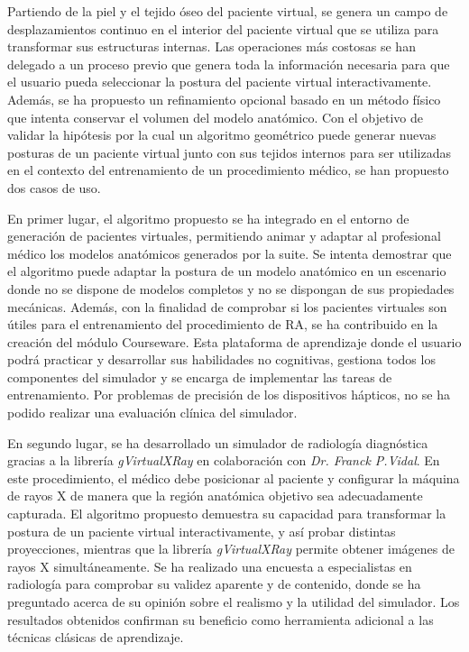 Partiendo de la piel y el tejido óseo del paciente virtual, se genera un campo de desplazamientos continuo en el interior del paciente virtual que se utiliza para transformar sus estructuras internas. Las operaciones más costosas se han delegado a un proceso previo que genera toda la información necesaria para que el usuario pueda seleccionar la postura del paciente virtual interactivamente. Además, se ha propuesto un refinamiento opcional basado en un método físico que intenta conservar el volumen del modelo anatómico. Con el objetivo de validar la hipótesis por la cual un algoritmo geométrico puede generar nuevas posturas de un paciente virtual junto con sus tejidos internos para ser utilizadas en el contexto del entrenamiento de un procedimiento médico, se han propuesto dos casos de uso. 

En primer lugar, el algoritmo propuesto se ha integrado en el entorno de generación de pacientes virtuales, permitiendo animar y adaptar al profesional médico los modelos anatómicos generados por la suite. Se intenta demostrar que el algoritmo puede adaptar la postura de un modelo anatómico en un escenario donde no se dispone de modelos completos y no se dispongan de sus propiedades mecánicas. Además, con la finalidad de comprobar si los pacientes virtuales son útiles para  el entrenamiento del procedimiento de RA, se ha contribuido en la creación del módulo Courseware. Esta plataforma de aprendizaje donde el usuario podrá practicar y desarrollar sus habilidades no cognitivas, gestiona todos los componentes del simulador y se encarga de implementar las tareas de entrenamiento. Por problemas de precisión de los dispositivos hápticos, no se ha podido realizar una evaluación clínica del simulador. 



En segundo lugar, se ha desarrollado un simulador de radiología diagnóstica gracias a la librería \emph{gVirtualXRay} en colaboración con \emph{Dr. Franck P.Vidal}. En este procedimiento, el médico debe posicionar al paciente y configurar la máquina de rayos X de manera que la región anatómica objetivo sea adecuadamente capturada. El algoritmo propuesto demuestra su capacidad para transformar la postura de un paciente virtual interactivamente, y así probar distintas proyecciones, mientras que la librería \emph{gVirtualXRay} permite  obtener imágenes de rayos X simultáneamente. Se ha realizado una encuesta a especialistas en radiología para comprobar su validez aparente y de contenido, donde se ha preguntado acerca de su opinión sobre el realismo y la utilidad del simulador. Los resultados obtenidos confirman su beneficio como herramienta adicional a las técnicas clásicas de aprendizaje.



